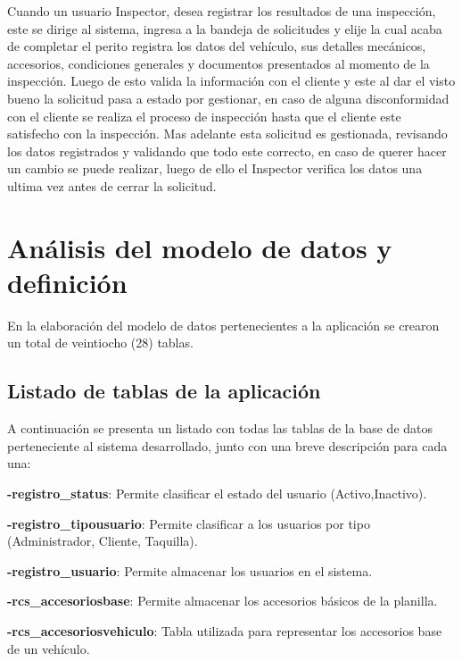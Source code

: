 Cuando un usuario Inspector, desea registrar los resultados de una inspección, este se dirige al sistema, ingresa a la bandeja de solicitudes y elije la cual acaba de completar el perito registra los datos del vehículo, sus detalles mecánicos, accesorios, condiciones generales y documentos presentados al momento de la inspección. Luego de esto valida la información con el cliente y este al dar el visto bueno la solicitud pasa a estado por gestionar, en caso de alguna disconformidad con el cliente se realiza el proceso de inspección hasta que el cliente este satisfecho con la inspección. Mas adelante esta solicitud es gestionada, revisando los datos registrados y validando que todo este correcto, en caso de querer hacer un cambio se puede realizar, luego de ello el Inspector verifica los datos una ultima vez antes de cerrar la solicitud.
\setlength{\parskip}{0mm}


\section{Análisis del modelo de datos y definición} 
\setlength{\parskip}{5mm}

En la elaboración del modelo de datos pertenecientes a la aplicación se crearon un total de veintiocho (28) tablas.

\setlength{\parskip}{0mm}

\subsection{Listado de tablas de la aplicación}

\setlength{\parskip}{5mm}

A continuación se presenta un listado con todas las tablas de la base de datos perteneciente al sistema desarrollado, junto con una breve descripción para cada una:


\textbf{-registro\_status}: Permite clasificar el estado del usuario (Activo,Inactivo).

\textbf{-registro\_tipousuario}: Permite clasificar a los usuarios por tipo (Administrador, Cliente, Taquilla).

\textbf{-registro\_usuario}: Permite almacenar los usuarios en el sistema.

\textbf{-rcs\_accesoriosbase}: Permite almacenar los accesorios básicos de la planilla.

\textbf{-rcs\_accesoriosvehiculo}: Tabla utilizada para representar los accesorios base de un vehículo.


